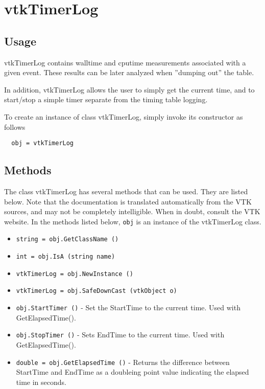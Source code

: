 \section{vtkTimerLog}

\subsection{Usage}

 vtkTimerLog contains walltime and cputime measurements associated
 with a given event.  These results can be later analyzed when
 ''dumping out'' the table.

 In addition, vtkTimerLog allows the user to simply get the current
 time, and to start/stop a simple timer separate from the timing
 table logging.

To create an instance of class vtkTimerLog, simply
invoke its constructor as follows
\begin{verbatim}
  obj = vtkTimerLog
\end{verbatim}
\subsection{Methods}

The class vtkTimerLog has several methods that can be used.
  They are listed below.
Note that the documentation is translated automatically from the VTK sources,
and may not be completely intelligible.  When in doubt, consult the VTK website.
In the methods listed below, \verb|obj| is an instance of the vtkTimerLog class.
\begin{itemize}
\item  \verb|string = obj.GetClassName ()|

\item  \verb|int = obj.IsA (string name)|

\item  \verb|vtkTimerLog = obj.NewInstance ()|

\item  \verb|vtkTimerLog = obj.SafeDownCast (vtkObject o)|

\item  \verb|obj.StartTimer ()| -  Set the StartTime to the current time. Used with GetElapsedTime().

\item  \verb|obj.StopTimer ()| -  Sets EndTime to the current time. Used with GetElapsedTime().

\item  \verb|double = obj.GetElapsedTime ()| -  Returns the difference between StartTime and EndTime as 
 a doubleing point value indicating the elapsed time in seconds.

\end{itemize}
